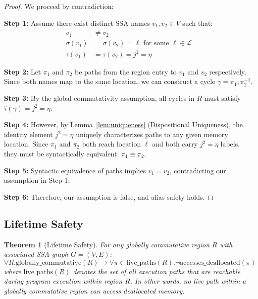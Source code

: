 \documentclass[acmsmall,anonymous,review,screen]{acmart}
\newtheorem{theorem}{Theorem}
\begin{document}
	\begin{proof}
		We proceed by contradiction:
		
		\textbf{Step 1:} Assume there exist distinct SSA names $v_1, v_2 \in V$ such that:
		\begin{align}
			v_1 &\neq v_2 \\
			\sigma(v_1) &= \sigma(v_2) = \ell \text{ for some } \ell \in \mathcal{L} \\
			\tau(v_1) &= \tau(v_2) = j^{2} = \eta
		\end{align}
		
		\textbf{Step 2:} Let $\pi_1$ and $\pi_2$ be paths from the region entry to $v_1$ and $v_2$ respectively. Since both names map to the same location, we can construct a cycle $\gamma = \pi_1; \pi_2^{-1}$.
		
		\textbf{Step 3:} By the global commutativity assumption, all cycles in $R$ must satisfy $\hat{\tau}(\gamma) = j^{2} = \eta$.
		
		\textbf{Step 4:} However, by Lemma~\ref{lem:uniqueness} (Dispositional Uniqueness), the identity element $j^{2} = \eta$ uniquely characterizes paths to any given memory location. Since $\pi_1$ and $\pi_2$ both reach location $\ell$ and both carry $j^{2} = \eta$ labels, they must be syntactically equivalent: $\pi_1 \equiv \pi_2$.
		
		\textbf{Step 5:} Syntactic equivalence of paths implies $v_1 = v_2$, contradicting our assumption in Step 1.
		
		\textbf{Step 6:} Therefore, our assumption is false, and alias safety holds.
	\end{proof}
	
	\subsection{Lifetime Safety}
	
	\begin{theorem}[Lifetime Safety]
		For any globally commutative region $R$ with associated SSA graph $G = (V, E)$:
		\begin{equation}
			\forall R.\text{globally\_commutative}(R) \to \forall\pi \in \text{live\_paths}(R).\neg\text{accesses\_deallocated}(\pi)
		\end{equation}
		where $\text{live\_paths}(R)$ denotes the set of all execution paths that are reachable during program execution within region $R$. In other words, no live path within a globally commutative region can access deallocated memory.
	\end{theorem}
	
\end{document}
